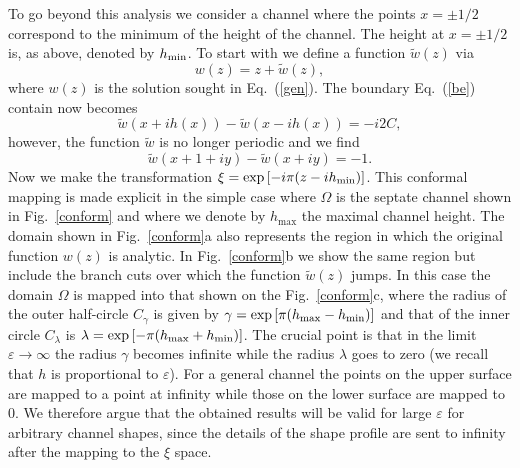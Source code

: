 \documentclass[pre,showpacs,preprintnumbers,amsmath,amssymb,superscriptaddress]{revtex4-1}
\begin{document}
{{To go beyond this analysis we consider a channel where the points $x=\pm 1/2$ correspond to the minimum of the height of the channel. The height at $x=\pm1/2$ is, as above, denoted by $h_{\rm min}$. 
To start with we define a function $\tilde w(z)$ via
\begin{equation}
w(z) = z+\tilde w(z),
\end{equation}
where $w(z)$ is the solution sought in Eq.~(\ref{gen}). The boundary Eq.~(\ref{be}) contain now becomes 
\begin{equation}
\tilde w\left(x+ih(x)\right) - \tilde w\left(x-ih(x)\right) = -i2C\label{be2},
\end{equation}
however, the function $\tilde w$ is no longer periodic and we find
\begin{equation}
\tilde w(x+1 +iy) -\tilde w(x+iy) = -1.\label{jump}
\end{equation}
Now we make the transformation $\xi=\exp \left[-i \pi (z-ih_{\rm min}) \right]$. This conformal mapping is made explicit in the simple case where $\Omega$ is the  septate channel shown in Fig.~\ref{conform} and  where we denote by $h_\mathrm{max}$ the maximal channel height. The domain shown in Fig.~\ref{conform}a also represents the region in which the original function $w(z)$ is analytic. In Fig.~\ref{conform}b we show the same region but include the branch cuts over which the function $\tilde w(z)$ jumps. In this case the domain $\Omega$ is mapped into that shown on the Fig.~\ref{conform}c, where the radius of the outer half-circle $C_\gamma$ is given by $\gamma=\exp \left[{\pi} (h_{\rm max}-h_{\rm min})\right]$ and that of the inner circle $C_\lambda$ is $\lambda=\exp \left[-\pi (h_{\rm max}+h_{\rm min})\right]$. The crucial point is that in the limit $\varepsilon \to \infty$ the radius $\gamma$ becomes infinite while the radius $\lambda$ goes to zero (we recall that $h$ is  proportional to $\varepsilon$). For a general channel the points on the upper surface are mapped to a point at infinity while those on the lower surface are mapped to $0$. We therefore argue that the obtained results will be valid for large $\varepsilon$ for arbitrary channel shapes, since the details of the shape profile are sent to infinity after the mapping to the $\xi$ space. 

}}
\end{document}

